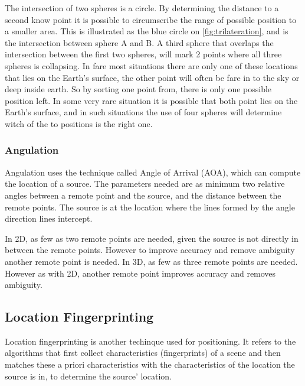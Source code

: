   The intersection of two spheres is a circle. By determining the distance to a second know point it is possible to circumscribe the range of possible position to a smaller area.
  This is illustrated as the blue circle on \cref{fig:trilateration}, and is the intersection between sphere A and B.
  A third sphere that overlaps the intersection between the first two spheres, will mark 2 points where all three spheres is collapsing. In fare most situations there are only one of these locations that lies on the Earth's surface, the other point will often be fare in to the sky or deep inside earth. So by sorting one point from, there is only one possible position left. 
  In some very rare situation it is possible that both point lies on the Earth's surface, and in such situations the use of four spheres will determine witch of the to positions is the right one.



  \subsubsection{Angulation}

  Angulation uses the technique called Angle of Arrival (AOA), which can compute the location of a source. The parameters needed are as minimum two relative angles between a remote point and the source, and the distance between the remote points. The source is at the location where the lines formed by the angle direction lines intercept. 

  In 2D, as few as two remote points are needed, given the source is not directly in between the remote points. However to improve accuracy and remove ambiguity  another remote point is needed. In 3D, as few as three remote points are needed. However as with 2D, another remote point improves accuracy and removes ambiguity. \cite{Liu2007, Sun2009, Boontrai2009}

  


  

  \subsection{Location Fingerprinting}


  Location fingerprinting is another techinque used for positioning. It refers to the algorithms that first collect characteristics (fingerprints) of a scene and then matches these a priori characteristics with the characteristics of the location the source is in, to determine the source' location.

